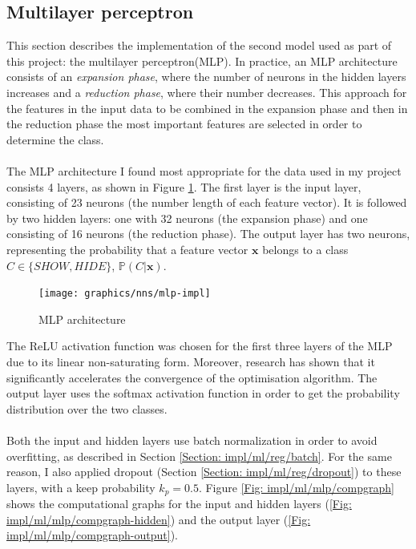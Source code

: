 	\subsection{Multilayer perceptron} \label{Section: impl/ml/mlp}
	This section describes the implementation of the second model used as part of this project: the multilayer perceptron(MLP). In practice, an MLP architecture consists of an \textit{expansion phase}, where the number of neurons in the hidden layers increases and a \textit{reduction phase}, where their number decreases. This approach for the features in the input data to be combined in the expansion phase and then in the reduction phase the most important features are selected in order to determine the class.
	\\ \\
	The MLP architecture I found most appropriate for the data used in my project consists 4 layers, as shown in Figure \ref{Fig: impl/ml/mlp}. The first layer is the input layer, consisting of 23 neurons (the number length of each feature vector). It is followed by two hidden layers: one with 32 neurons (the expansion phase) and one consisting of 16 neurons (the reduction phase). The output layer has two neurons, representing the probability that a feature vector $\mathbf{x}$ belongs to a class $C \in \{ SHOW, HIDE \}$, $\mathbb{P}(C|\mathbf{x})$.
	\begin{figure}[H]
		\centering
		\texttt{[image: graphics/nns/mlp-impl]}
		\caption{MLP architecture}
		\label{Fig: impl/ml/mlp}
	\end{figure} 

	The ReLU activation function was chosen for the first three layers of the MLP due to its linear non-saturating form. Moreover, research has shown that it significantly accelerates the convergence of the optimisation algorithm\cite{Nair:2010:RLU:3104322.3104425}. The output layer uses the softmax activation function in order to get the probability distribution over the two classes. 
	\\ \\
	Both the input and hidden layers use batch normalization in order to avoid overfitting, as described in Section \ref{Section: impl/ml/reg/batch}. For the same reason, I also applied dropout (Section \ref{Section: impl/ml/reg/dropout}) to these layers, with a keep probability $k_p = 0.5$. Figure \ref{Fig: impl/ml/mlp/compgraph} shows the computational graphs for the input and hidden layers (\ref{Fig: impl/ml/mlp/compgraph-hidden}) and the output layer (\ref{Fig: impl/ml/mlp/compgraph-output}).
